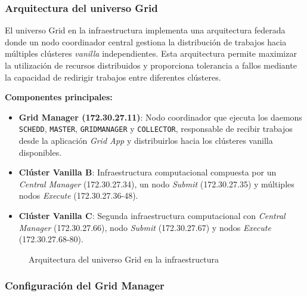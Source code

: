 \FloatBarrier\subsubsection{Arquitectura del universo Grid}

El universo Grid en la infraestructura \GRID implementa una arquitectura federada donde un nodo coordinador central gestiona la distribución de trabajos hacia múltiples clústeres \textit{vanilla} independientes. Esta arquitectura permite maximizar la utilización de recursos distribuidos y proporciona tolerancia a fallos mediante la capacidad de redirigir trabajos entre diferentes clústeres.

\textbf{Componentes principales:}

\begin{itemize}
	\item \textbf{Grid Manager (172.30.27.11)}: Nodo coordinador que ejecuta los daemons \texttt{SCHEDD}, \texttt{MASTER}, \texttt{GRIDMANAGER} y \texttt{COLLECTOR}, responsable de recibir trabajos desde la aplicación \textit{Grid App} y distribuirlos hacia los clústeres vanilla disponibles.
	
	\item \textbf{Clúster Vanilla B}: Infraestructura computacional compuesta por un \textit{Central Manager} (172.30.27.34), un nodo \textit{Submit} (172.30.27.35) y múltiples nodos \textit{Execute} (172.30.27.36-48).
	
	\item \textbf{Clúster Vanilla C}: Segunda infraestructura computacional con \textit{Central Manager} (172.30.27.66), nodo \textit{Submit} (172.30.27.67) y nodos \textit{Execute} (172.30.27.68-80).
\end{itemize}

\begin{figure}
	\centering
	\caption{Arquitectura del universo Grid en la infraestructura \GRID}
	\label{fig:grid-architecture}
\end{figure}

\FloatBarrier\subsubsection{Configuración del Grid Manager}


